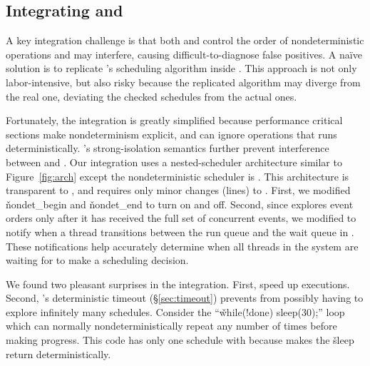 


\subsection{Integrating \xxx and \dbug} \label{sec:smt+mc}

A key integration challenge is that both \xxx and \dbug control the order
of nondeterministic operations and may interfere, causing
difficult-to-diagnose false positives.  A na\"{i}ve solution
is to replicate \xxx's scheduling algorithm inside \dbug.  This
approach is not only labor-intensive, but also risky because the
replicated algorithm may diverge from the real one, deviating the checked
schedules from the actual ones.

Fortunately, the integration is greatly simplified because performance
critical sections make nondeterminism explicit, and \dbug can ignore
operations that \xxx runs deterministically.  \xxx's strong-isolation
semantics further prevent interference
between \xxx and \dbug.  Our integration uses a nested-scheduler
architecture similar to Figure~\ref{fig:arch} except the
nondeterministic scheduler is \dbug.  This architecture is transparent
to \dbug, and requires only minor changes (\locsmcmc lines) to \xxx.
First, we modified \v{nondet\_begin} and \v{nondet\_end} to turn \dbug
on and off.  Second, since \dbug explores event orders only after
it has received the full set of concurrent events, we modified
\xxx to notify \dbug when a thread transitions between the run queue
and the wait queue in \xxx. These notifications help \dbug accurately
determine when all threads in the system are waiting for \dbug to make
a scheduling decision.

We found two pleasant surprises in the
integration.  First, \computes speed up \dbug executions.  Second,
\xxx's deterministic timeout (\S\ref{sec:timeout}) prevents \dbug from
possibly having to explore infinitely many schedules.  Consider the
``\v{while(!done) sleep(30);}'' loop which can normally
nondeterministically repeat any number of times before making
progress.  This code has only one schedule with \ecosys because \xxx
makes the \v{sleep} return deterministically.


